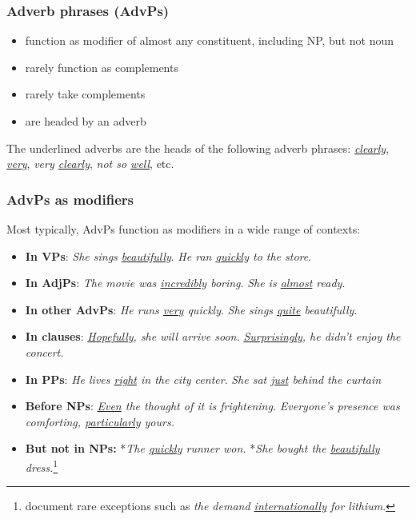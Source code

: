 \subsubsection*{Adverb phrases (AdvPs)} \label{sec:advps}

\begin{itemize}
   \item function as modifier of almost any constituent, including NP, but not noun
   \item rarely function as complements
   \item rarely take complements
   \item are headed by an adverb
\end{itemize}

The underlined adverbs are the heads of the following adverb phrases: \textit{\uline{clearly}}, \textit{\uline{very}}, \textit{very \uline{clearly}}, \textit{not so \uline{well}}, etc.

\subsubsection*{AdvPs as modifiers}

Most typically, AdvPs function as modifiers in a wide range of contexts:

\begin{itemize}
   \item \textbf{In VPs}: \textit{She sings \uline{beautifully}}. \textit{He ran \uline{quickly} to the store}.
   \item \textbf{In AdjPs}: \textit{The movie was \uline{incredibly} boring}. \textit{She is \uline{almost} ready}.
   \item \textbf{In other AdvPs}: \textit{He runs \uline{very} quickly}.  \textit{She sings \uline{quite} beautifully}.
   \item \textbf{In clauses}: \textit{\uline{Hopefully}, she will arrive soon.} \textit{\uline{Surprisingly}, he didn't enjoy the concert.}
   \item \textbf{In PPs}: \textit{He lives \uline{right} in the city center}. \textit{She sat \uline{just} behind the curtain}
   \item \textbf{Before NPs}: \textit{\uline{Even} the thought of it is frightening.} \textit{Everyone's presence was comforting, \uline{particularly} yours.}
   \item \textbf{But not in NPs:} *\textit{The \uline{quickly} runner won.} *\textit{She bought the \uline{beautifully} dress.}\footnote{\citet{payne2010} document rare exceptions such as \textit{the demand \uline{internationally} for lithium}.}
\end{itemize}


